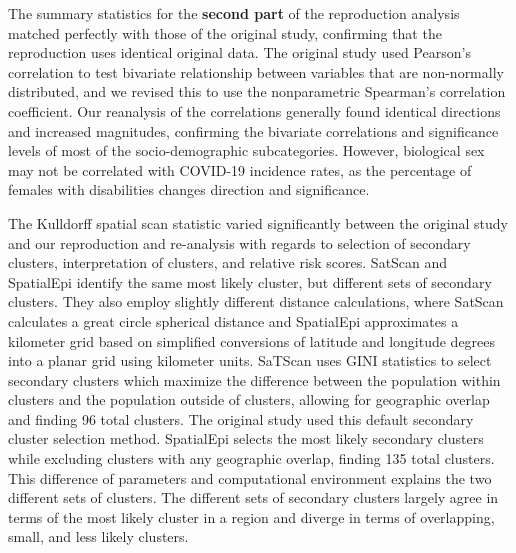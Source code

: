 \documentclass[
]{article}
\begin{document}
The summary statistics for the \textbf{second part} of the reproduction
analysis matched perfectly with those of the original study, confirming
that the reproduction uses identical original data. The original study
used Pearson's correlation to test bivariate relationship between
variables that are non-normally distributed, and we revised this to use
the nonparametric Spearman's correlation coefficient. Our reanalysis of
the correlations generally found identical directions and increased
magnitudes, confirming the bivariate correlations and significance
levels of most of the socio-demographic subcategories. However,
biological sex may not be correlated with COVID-19 incidence rates, as
the percentage of females with disabilities changes direction and
significance.

The Kulldorff spatial scan statistic varied significantly between the
original study and our reproduction and re-analysis with regards to
selection of secondary clusters, interpretation of clusters, and
relative risk scores. SatScan and SpatialEpi identify the same most
likely cluster, but different sets of secondary clusters. They also
employ slightly different distance calculations, where SatScan
calculates a great circle spherical distance and SpatialEpi approximates
a kilometer grid based on simplified conversions of latitude and
longitude degrees into a planar grid using kilometer units. SaTScan uses
GINI statistics to select secondary clusters which maximize the
difference between the population within clusters and the population
outside of clusters, allowing for geographic overlap and finding 96
total clusters. The original study used this default secondary cluster
selection method. SpatialEpi selects the most likely secondary clusters
while excluding clusters with any geographic overlap, finding 135 total
clusters. This difference of parameters and computational environment
explains the two different sets of clusters. The different sets of
secondary clusters largely agree in terms of the most likely cluster in
a region and diverge in terms of overlapping, small, and less likely
clusters.
\end{document}

